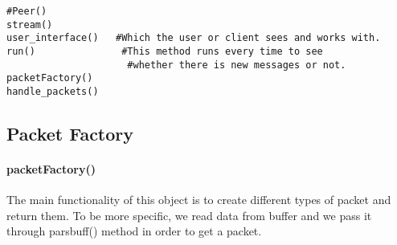 \documentclass{article}
\begin{document}
\begin{lstlisting}
#Peer()
stream()
user_interface()   #Which the user or client sees and works with. 
run() 				#This method runs every time to see 
				     #whether there is new messages or not.
packetFactory()
handle_packets()
\end{lstlisting}
\subsection{Packet Factory}
\paragraph{packetFactory()}The main functionality of this object is to create different types of packet and return them. To be more specific, we read data from buffer and we pass it through pars\underline{\hspace{.05in}}buff() method in order to get a packet.
\end{document}
